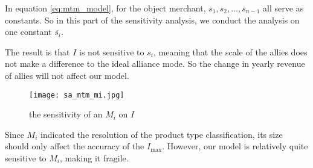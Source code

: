 \begin{enumerate}
In equation \ref{eq:mtm_model}, for the object merchant, $s_1,s_2,\ldots,s_{n-1}$ all serve as constants. So in this part of the sensitivity analysis, we conduct the analysis on one constant $\overline{s_i}$.

The result is that $I$ is not sensitive to $s_i$, meaning that the scale of the allies does not make a difference to the ideal alliance mode. So the change in yearly revenue of allies will not affect our model.


\begin{figure}[H]
\centering
\texttt{[image: sa\_mtm\_mi.jpg]}
\caption{the sensitivity of an $M_i$ on $I$}
\label{fig:sa_mtm_mi}
\end{figure}

Since $M_i$ indicated the resolution of the product type classification, its size should only affect the accuracy of the $I_{\max}$. However, our model is relatively quite sensitive to $M_i$, making it fragile.
\end{enumerate}